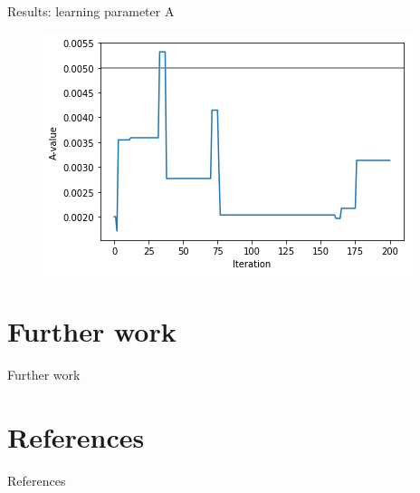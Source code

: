 \documentclass[aspectratio=169]{beamer}
\begin{document}
\begin{frame}{Results: learning parameter A}
\begin{figure}
	        \includegraphics[scale=0.4]{240_0.005.png}
	    \end{figure}
	    
	\end{frame}
	
	\section{Further work}
	
	\begin{frame}{Further work}
	    
	\end{frame}
	
	\section{References}
	
	\begin{frame}{References}
	    
	\end{frame}
\end{document}
